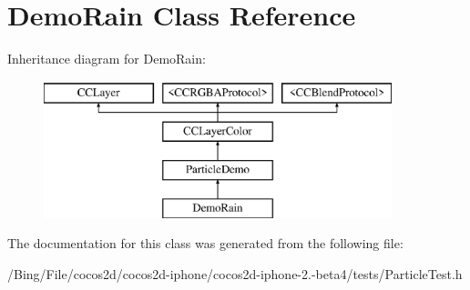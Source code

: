 \hypertarget{interface_demo_rain}{\section{Demo\-Rain Class Reference}
\label{interface_demo_rain}
}
Inheritance diagram for Demo\-Rain\-:\begin{figure}[H]
\begin{center}
\leavevmode
\includegraphics[height=4.000000cm]{interface_demo_rain}
\end{center}
\end{figure}


The documentation for this class was generated from the following file\-:\begin{DoxyCompactItemize}
\item 
/\-Bing/\-File/cocos2d/cocos2d-\/iphone/cocos2d-\/iphone-\/2.-\/beta4/tests/Particle\-Test.\-h\end{DoxyCompactItemize}
